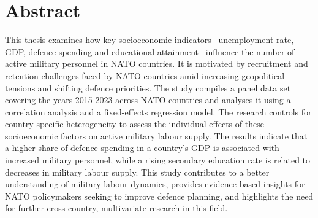 \chapter*{Abstract}

This thesis examines how key socioeconomic indicators \textemdash\ unemployment rate, GDP, defence spending and educational attainment \textemdash\ influence the number of active military personnel in NATO countries.
It is motivated by recruitment and retention challenges faced by NATO countries amid increasing geopolitical tensions and shifting defence priorities.
The study compiles a panel data set covering the years 2015-2023 across NATO countries and analyses it using a correlation analysis and a fixed-effects regression model. 
The research controls for country-specific heterogeneity to assess the individual effects of these socioeconomic factors on active military labour supply.
The results indicate that a higher share of defence spending in a country's GDP is associated with increased military personnel, while a rising secondary education rate is related to decreases in military labour supply. 
This study contributes to a better understanding of military labour dynamics, provides evidence-based insights for NATO policymakers seeking to improve defence planning, and highlights the need for further cross-country, multivariate research in this field.